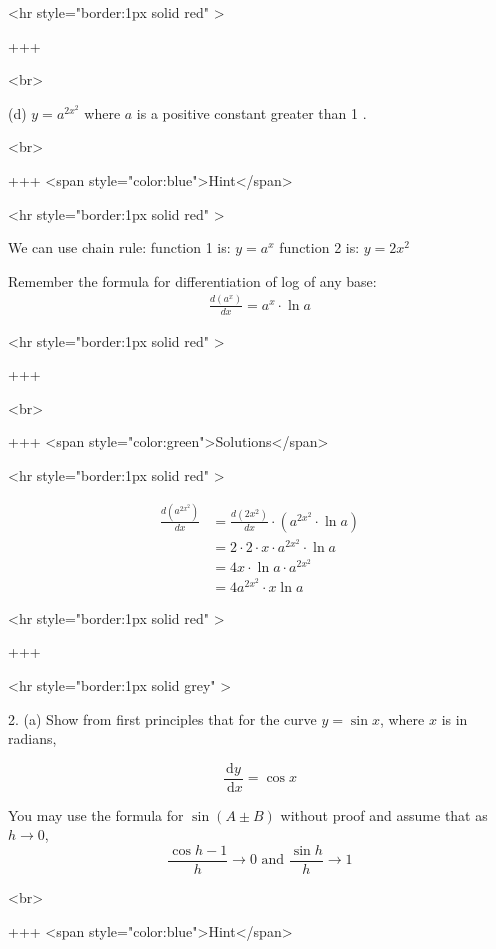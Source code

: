 <hr style="border:1px solid red" >

+++

<br>

(d) $y=a^{2 x^{2}}$ where $a$ is a positive constant greater than 1 .

<br>

+++ <span style="color:blue">Hint</span>

<hr style="border:1px solid red" >

We can use chain rule:
function 1 is: $y=a^x$
function 2 is: $y=2 x^2$

Remember the formula for differentiation of log of any base:
\begin{equation}
\begin{aligned}
\frac{d\left(a^x\right)}{d x}=a^x \cdot \ln a
\end{aligned}
\end{equation}

<hr style="border:1px solid red" >

+++

<br>

+++ <span style="color:green">Solutions</span>

<hr style="border:1px solid red" >

\begin{equation}
\begin{aligned}
\frac{d\left(a^{2 x^2}\right)}{d x} & =\frac{d\left(2 x^2\right)}{d x} \cdot (a^{2 x^2} \cdot \ln a) \\
& =2 \cdot 2 \cdot x \cdot a^{2 x^2} \cdot \ln a \\
& =4 x \cdot \ln a \cdot a^{2 x^2} \\
& =4 a^{2 x^2} \cdot x \ln a
\end{aligned}
\end{equation}

<hr style="border:1px solid red" >

+++

<hr style="border:1px solid grey" >


2.
(a) Show from first principles that for the curve $y=\sin x$, where $x$ is in radians,

$$
\frac{\mathrm{d} y}{\mathrm{~d} x}=\cos x
$$

You may use the formula for $\sin (A \pm B)$ without proof and assume that as $h \rightarrow 0$,
$$
\frac{\cos h-1}{h} \rightarrow 0 \text { and } \frac{\sin h}{h} \rightarrow 1
$$

<br>

+++ <span style="color:blue">Hint</span>

